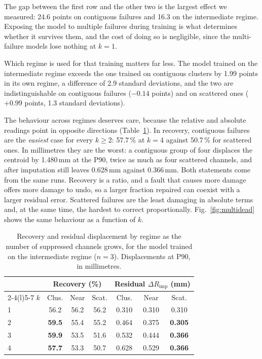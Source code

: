 \documentclass[10pt,conference]{IEEEtran}
\begin{document}
The gap between the first row and the other two is the largest effect we
measured: 24.6 points on contiguous failures and 16.3 on the intermediate
regime. Exposing the model to multiple failures during training is what
determines whether it survives them, and the cost of doing so is negligible,
since the multi-failure models lose nothing at $k=1$.

Which regime is used for that training matters far less. The model trained on
the intermediate regime exceeds the one trained on contiguous clusters by 1.99
points in its own regime, a difference of 2.9 standard deviations, and the two
are indistinguishable on contiguous failures ($-0.14$ points) and on scattered
ones ($+0.99$ points, 1.3 standard deviations).

The behaviour across regimes deserves care, because the relative and absolute
readings point in opposite directions (Table~\ref{tab:regimes-k}). In recovery,
contiguous failures are the \emph{easiest} case for every $k \ge 2$: 57.7\,\%
at $k=4$ against 50.7\,\% for scattered ones. In millimetres they are the
worst: a contiguous group of four displaces the centroid by 1.480\,mm at the
P90, twice as much as four scattered channels, and after imputation
still leaves 0.628\,mm against 0.366\,mm. Both statements come from the same
runs. Recovery is a ratio, and a fault that causes more damage offers more
damage to undo, so a larger fraction repaired can coexist with a larger
residual error. Scattered failures are the least damaging in absolute terms
and, at the same time, the hardest to correct proportionally.
Fig.~\ref{fig:multidead} shows the same behaviour as a function of $k$.

\begin{table}[t]
\centering
\caption{Recovery and residual displacement by regime as the number of
suppressed channels grows, for the model trained on the intermediate regime
($n=3$). Displacements at P90, in millimetres.}
\label{tab:regimes-k}
\begin{tabular}{@{}lcccccc@{}}
\toprule
& \multicolumn{3}{c}{\textbf{Recovery (\%)}}
& \multicolumn{3}{c}{\textbf{Residual $\Delta R_{\mathrm{imp}}$ (mm)}} \\
\cmidrule(lr){2-4}\cmidrule(l){5-7}
$k$ & Clus. & Near & Scat. & Clus. & Near & Scat. \\
\midrule
1 & 56.2 & 56.2 & 56.2 & 0.310 & 0.310 & 0.310 \\
2 & \textbf{59.5} & 55.4 & 55.2 & 0.464 & 0.375 & \textbf{0.305} \\
3 & \textbf{59.9} & 53.5 & 51.6 & 0.532 & 0.444 & \textbf{0.366} \\
4 & \textbf{57.7} & 53.3 & 50.7 & 0.628 & 0.529 & \textbf{0.366} \\
\bottomrule
\end{tabular}
\end{table}
\end{document}
